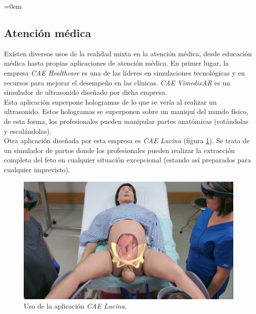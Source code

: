 \parindent=0em
\subsection{Atención médica}
\noindent


Existen diversos usos de la realidad mixta en la atención médica, desde educación médica hasta propias aplicaciones de atención médica. En primer lugar, la empresa \textit{CAE Healthcare} es una de las líderes en simulaciones tecnológicas y en recursos para mejorar el desempeño en las clínicas. \textit{CAE VimedixAR} es un simulador de ultrasonido diseñado por dicha empresa. \\

Esta aplicación superpone hologramas de lo que se vería al realizar un ultrasonido. Estos hologramas se superponen sobre un maniquí del mundo físico, de esta forma, los profesionales pueden manipular partes anatómicas (rotándolas y escalándolas).\\

Otra aplicación diseñada por esta empresa es \textit{CAE Lucina} (figura \ref{fig:caelucina}). Se trata de un simulador de partos donde los profesionales pueden realizar la extracción completa del feto en cualquier situación excepcional (estando así preparados para cualquier imprevisto).\\

\begin{figure}[h]
    \centering
    \includegraphics[scale=0.38]{Images/Estado del arte/caehealthcareparto.jpg}
    \caption[Uso de la aplicación \textit{CAE Lucina}]{Uso de la aplicación \textit{CAE Lucina}\footnotemark.}
    \label{fig:caelucina}
\end{figure}

